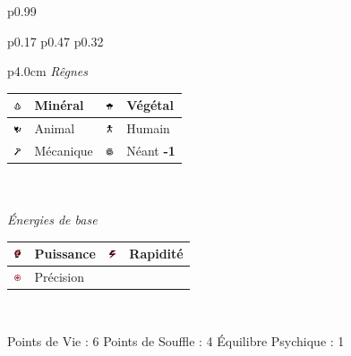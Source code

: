 \documentclass[11pt,twoside,a4paper]{article}
\def\imgMINER{\includegraphics[width=0.25cm]{../../../../../imgGraphics/rolePlayingGame/SimulacreS/mini12x12/mineral.png} }
\def\imgVEGET{\includegraphics[width=0.25cm]{../../../../../imgGraphics/rolePlayingGame/SimulacreS/mini12x12/vegetal.png} }
\def\imgANIMA{\includegraphics[width=0.25cm]{../../../../../imgGraphics/rolePlayingGame/SimulacreS/mini12x12/animal.png} }
\def\imgHUMAI{\includegraphics[width=0.25cm]{../../../../../imgGraphics/rolePlayingGame/SimulacreS/mini12x12/humain.png} }
\def\imgMECAN{\includegraphics[width=0.25cm]{../../../../../imgGraphics/rolePlayingGame/SimulacreS/mini12x12/mecanique.png} }
\def\imgNEANT{\includegraphics[width=0.25cm]{../../../../../imgGraphics/rolePlayingGame/SimulacreS/mini12x12/neant.png} }
\def\imgPUISS{\includegraphics[width=0.25cm]{../../../../../imgGraphics/rolePlayingGame/SimulacreS/mini12x12/puissance.png} }
\def\imgRAPID{\includegraphics[width=0.25cm]{../../../../../imgGraphics/rolePlayingGame/SimulacreS/mini12x12/rapidite.png} }
\def\imgPRECI{\includegraphics[width=0.25cm]{../../../../../imgGraphics/rolePlayingGame/SimulacreS/mini12x12/precision.png} }
\begin{document}
\begin{longtable}[ht]{ p{} }
\begin{tabular}[h]{ p{} p{} p{} }
			\begin{tabular}[h]{ p{4.0cm} }
				\emph{R{\^e}gnes}  \\
				{\footnotesize %
				\begin{tabular}[h]{|p{0.25cm}|p{1.50cm}|p{0.25cm}|p{1.50cm}|}
					\hline
					\imgMINER 	& Min{\'e}ral		\newline 0	 & \imgVEGET	& V{\'e}g{\'e}tal		\newline 0					\\
					\hline
					\imgANIMA 	& Animal			\newline 0	 & \imgHUMAI	& Humain				\newline 1					\\
					\hline
					\imgMECAN	& M{\'e}canique		\newline 2	 & \imgNEANT	& N{\'e}ant				\newline \textbf{-1}		\\ 
					\hline
				\end{tabular} } \\
				\\
				\emph{{\'E}nergies de base} \\
				{\footnotesize %
				\begin{tabular}[h]{|p{0.25cm}|p{1.50cm}|p{0.25cm}|p{1.50cm}|}
					\hline
					\imgPUISS	& Puissance			\newline 0	 & \imgRAPID	& Rapidit{\'e}			\newline 1				\\
					\hline
					\imgPRECI	& Pr{\'e}cision		\newline 1	 &				&												\\
					\hline
				\end{tabular} } \\
			\end{tabular}
			\newline \newline \newline 
			Points de Vie : 6			\newline
			Points de Souffle : 4		\newline
			{\'E}quilibre Psychique : 1	\newline 
		\\ %

\end{tabular}
\end{longtable}
\end{document}
